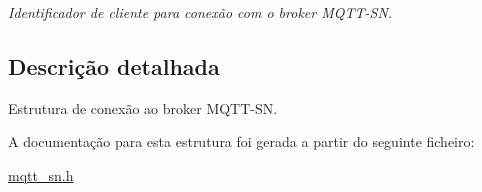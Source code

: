 \begin{DoxyCompactItemize}
\begin{DoxyCompactList}\small\item\em Identificador de cliente para conexão com o broker M\+Q\+T\+T-\/\+S\+N. \end{DoxyCompactList}\end{DoxyCompactItemize}


\subsection{Descrição detalhada}
Estrutura de conexão ao broker M\+Q\+T\+T-\/\+S\+N. 

A documentação para esta estrutura foi gerada a partir do seguinte ficheiro\+:\begin{DoxyCompactItemize}
\item 
\hyperlink{mqtt__sn_8h}{mqtt\+\_\+sn.\+h}\end{DoxyCompactItemize}
